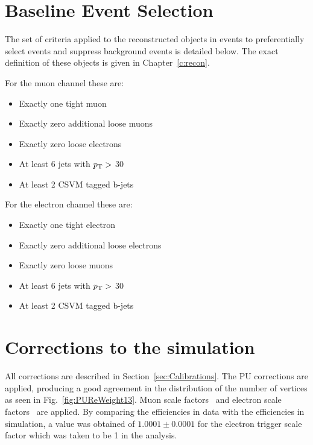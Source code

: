 \section{Baseline Event Selection}
\label{sec:baseline13}
The set of criteria applied to the reconstructed objects in events to preferentially select \tttt events and suppress background events is detailed below. The exact definition of these objects is given in Chapter~\ref{c:recon}.

For the muon channel these are:
\begin{itemize}
\setlength\itemsep{0em}
\item Exactly one tight muon
\item Exactly zero additional loose muons
\item Exactly zero loose electrons
\item At least 6 jets with $p_{\mathrm{T}} >$ 30 \GeV
\item At least 2 CSVM tagged b-jets
\end{itemize}
For the electron channel these are:
\begin{itemize}
\itemsep0em 
\item Exactly one tight electron
\item Exactly zero additional loose electrons
\item Exactly zero loose muons
\item At least 6 jets with $p_{\mathrm{T}} >$ 30 \GeV
\item At least 2 CSVM tagged b-jets
\end{itemize}

\section{Corrections to the simulation}
\label{sec:Calibrations13}
All corrections are described in Section~\ref{sec:Calibrations}. The PU corrections are applied, producing a good agreement in the distribution of the number of vertices as seen in Fig.~\ref{fig:PUReWeight13}. Muon scale factors~\cite{muonSFtwiki} and electron scale factors~\cite{electronSFtwiki} are applied. By comparing the efficiencies in data with the efficiencies in simulation, a value was obtained of $1.0001\pm0.0001$ for the electron trigger scale factor which was taken to be 1 in the analysis. 

